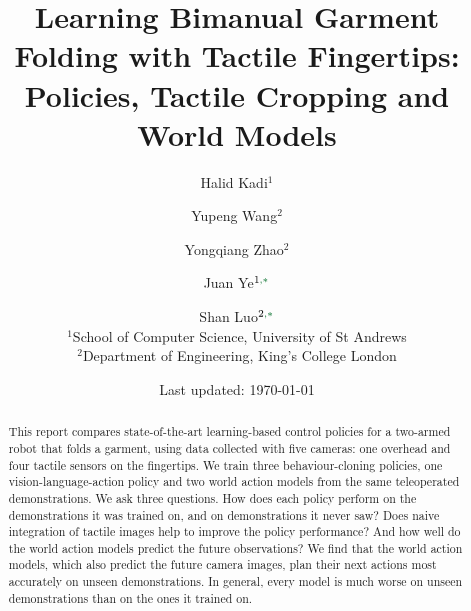 \documentclass[10pt]{article}
\title{Learning Bimanual Garment Folding with Tactile Fingertips:\\
Policies, Tactile Cropping and World Models}
\author{Halid Kadi$^{1}$ \and Yupeng Wang$^{2}$ \and Yongqiang Zhao$^{2}$
\and Juan Ye$^{1\dg{,*}}$ \and Shan Luo$^{2\dg{,*}}$\\[4pt]
\small $^{1}$School of Computer Science, University of St Andrews\\
\small $^{2}$Department of Engineering, King's College London\\[2pt]
\small \dg{$^{*}$Equal supervision.}}
\date{Last updated: \today}
\newcommand{\bl}[1]{{\color{newblue}#1}}
\newcommand{\new}[1]{#1}
\newcommand{\gn}[1]{#1}
\begin{document}
\maketitle

\begin{abstract}
This report compares \new{state-of-the-art learning-based control policies} for
a two-armed robot that folds a garment, \new{using data collected with five
cameras: one overhead and four tactile sensors on the fingertips.} \new{We train
three behaviour-cloning policies, one vision-language-action policy and two
world action models} from the same teleoperated demonstrations. We ask three
questions. \new{How does each policy perform on the demonstrations it was
trained on, and on demonstrations it never saw?} \bl{\gn{Does naive integration
of tactile images help to improve the policy performance?}} \bl{And how well do the
world action models predict \gn{the future observations}?} \new{We find that the world action models, which also predict the
future camera images, plan their next actions most accurately on unseen
demonstrations.} \bl{\gn{In general, every} model is much worse on unseen demonstrations than on the
ones it trained on.}
\end{abstract}







\clearpage
\appendix

\end{document}
